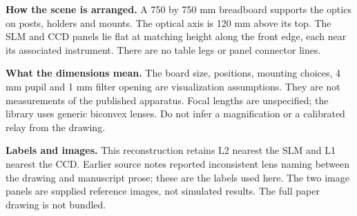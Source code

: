 \documentclass[11pt,a4paper]{article}
\begin{document}
\textbf{How the scene is arranged.} A 750 by 750 mm breadboard supports the optics on posts, holders and mounts. The optical axis is 120 mm above its top. The SLM and CCD panels lie flat at matching height along the front edge, each near its associated instrument. There are no table legs or panel connector lines.

\textbf{What the dimensions mean.} The board size, positions, mounting choices, 4 mm pupil and 1 mm filter opening are visualization assumptions. They are not measurements of the published apparatus. Focal lengths are unspecified; the library uses generic biconvex lenses. Do not infer a magnification or a calibrated relay from the drawing.

\textbf{Labels and images.} This reconstruction retains L2 nearest the SLM and L1 nearest the CCD. Earlier source notes reported inconsistent lens naming between the drawing and manuscript prose; these are the labels used here. The two image panels are supplied reference images, not simulated results. The full paper drawing is not bundled.
\clearpage
\end{document}
